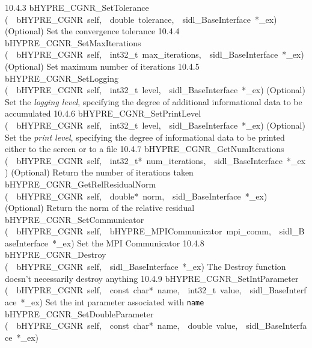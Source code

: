 \documentclass{article}
\begin{document}
\begin{cxxentry}
\begin{cxxentry}
\begin{cxxnames}
        {10.4.3}
        {bHYPRE\_CGNR\_SetTolerance}
        {(\ \ bHYPRE\_CGNR\ self,\ \ double\ tolerance,\ \ sidl\_BaseInterface\ *\_ex)}
        {
(Optional) Set the convergence tolerance}
        {10.4.4}
        {bHYPRE\_CGNR\_SetMaxIterations}
        {(\ \ bHYPRE\_CGNR\ self,\ \ int32\_t\ max\_iterations,\ \ sidl\_BaseInterface\ *\_ex)}
        {
(Optional) Set maximum number of iterations}
        {10.4.5}
        {bHYPRE\_CGNR\_SetLogging}
        {(\ \ bHYPRE\_CGNR\ self,\ \ int32\_t\ level,\ \ sidl\_BaseInterface\ *\_ex)}
        {
(Optional) Set the {\it logging level}, specifying the degree
of additional informational data to be accumulated}
        {10.4.6}
        {bHYPRE\_CGNR\_SetPrintLevel}
        {(\ \ bHYPRE\_CGNR\ self,\ \ int32\_t\ level,\ \ sidl\_BaseInterface\ *\_ex)}
        {
(Optional) Set the {\it print level}, specifying the degree
of informational data to be printed either to the screen or
to a file}
        {10.4.7}
        {bHYPRE\_CGNR\_GetNumIterations}
        {(\ \ bHYPRE\_CGNR\ self,\ \ int32\_t*\ num\_iterations,\ \ sidl\_BaseInterface\ *\_ex)}
        {
(Optional) Return the number of iterations taken}
        {}
\label{cxx.10.4.18}
        {bHYPRE\_CGNR\_GetRelResidualNorm}
        {(\ \ bHYPRE\_CGNR\ self,\ \ double*\ norm,\ \ sidl\_BaseInterface\ *\_ex)}
        {
(Optional) Return the norm of the relative residual}
        {}
\label{cxx.10.4.19}
        {bHYPRE\_CGNR\_SetCommunicator}
        {(\ \ bHYPRE\_CGNR\ self,\ \ bHYPRE\_MPICommunicator\ mpi\_comm,\ \ sidl\_BaseInterface\ *\_ex)}
        {
Set the MPI Communicator}
        {10.4.8}
        {bHYPRE\_CGNR\_Destroy}
        {(\ \ bHYPRE\_CGNR\ self,\ \ sidl\_BaseInterface\ *\_ex)}
        {
The Destroy function doesn't necessarily destroy anything}
        {10.4.9}
        {bHYPRE\_CGNR\_SetIntParameter}
        {(\ \ bHYPRE\_CGNR\ self,\ \ const\ char*\ name,\ \ int32\_t\ value,\ \ sidl\_BaseInterface\ *\_ex)}
        {
Set the int parameter associated with {\tt name}}
        {}
\label{cxx.10.4.20}
        {bHYPRE\_CGNR\_SetDoubleParameter}
        {(\ \ bHYPRE\_CGNR\ self,\ \ const\ char*\ name,\ \ double\ value,\ \ sidl\_BaseInterface\ *\_ex)}

\end{cxxnames}
\end{cxxentry}
\end{cxxentry}
\end{document}
